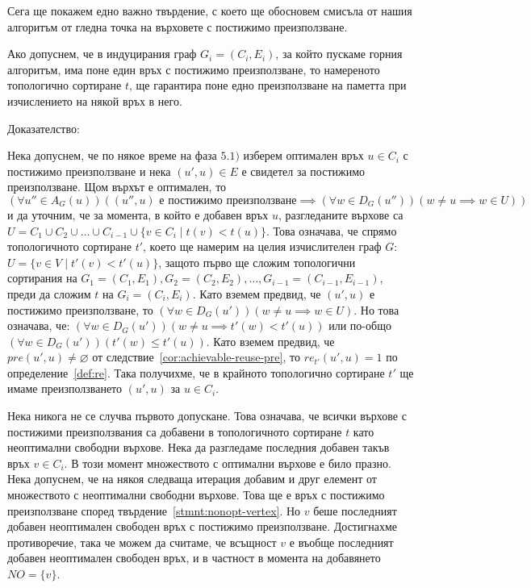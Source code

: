 \documentclass[12pt,twoside,a4paper]{article}
\begin{document}
	Сега ще покажем едно важно твърдение, с което ще обосновем смисъла от нашия алгоритъм от гледна точка на върховете с постижимо преизползване.
	
	\begin{statement}\label{stmnt:one-reuse} Ако допуснем, че в индуцирания граф $G_i=(C_i, E_i)$, за който пускаме горния алгоритъм, има поне един връх с постижимо преизползване, то намереното топологично сортиране $t$, ще гарантира поне едно преизползване на паметта при изчислението на някой връх в него.
		
		\noindent Доказателство:
		
		Нека допуснем, че по някое време на фаза $5.1)$ изберем оптимален връх $u \in C_i$ с постижимо преизползване и нека $(u',u) \in E$ е свидетел за постижимо преизползване. Щом върхът е оптимален, то $(\forall u'' \in A_G(u))((u'',u)\text{ е постижимо преизползване} \implies (\forall w \in D_G(u''))(w \neq u \implies w \in U))$ и да уточним, че за момента, в който е добавен връх $u$, разгледаните върхове са $U = C_1 \cup C_2 \cup \dots \cup C_{i-1} \cup \{v \in C_i \mid t(v) < t(u)\}$. Това означава, че спрямо топологичното сортиране $t'$, което ще намерим на целия изчислителен граф $G$: $U = \{v \in V \mid t'(v) < t'(u)\}$, защото първо ще сложим топологични сортирания на $G_1=(C_1,E_1), G_2=(C_2,E_2), \dots, G_{i-1}=(C_{i-1},E_{i-1})$, преди да сложим $t$ на $G_i=(C_i,E_i)$. Като вземем предвид, че $(u', u)$ е постижимо преизползване, то $(\forall w \in D_G(u'))(w \neq u \implies w \in U)$. Но това означава, че: $(\forall w \in D_G(u'))(w \neq u \implies t'(w) < t'(u))$ или по-общо $(\forall w \in D_G(u'))(t'(w) \le t'(u))$. Като вземем предвид, че $pre(u',u) \neq \varnothing$ от следствие~\ref{cor:achievable-reuse-pre}, то $re_{t'}(u',u)=1$ по определение~\ref{def:re}. Така получихме, че в крайното топологично сортиране $t'$ ще имаме преизползването $(u',u)$ за $u \in C_i$.
		
		Нека никога не се случва първото допускане. Това означава, че всички върхове с постижими преизползвания са добавени в топологичното сортиране $t$ като неоптимални свободни върхове. Нека да разгледаме последния добавен такъв връх $v \in C_i$. В този момент множеството с оптимални върхове е било празно. Нека допуснем, че на някоя следваща итерация добавим и друг елемент от множеството с неоптимални свободни върхове. Това ще е връх с постижимо преизползване според твърдение~\ref{stmnt:nonopt-vertex}. Но $v$ беше последният добавен неоптимален свободен връх с постижимо преизползване. Достигнахме противоречие, така че можем да считаме, че всъщност $v$ е въобще последният добавен неоптимален свободен връх, и в частност в момента на добавянето $NO = \{v\}$.
		

\end{statement}
\end{document}
